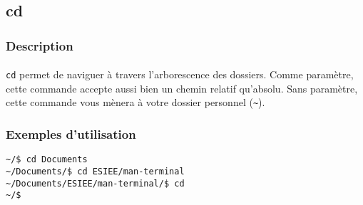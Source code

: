 \subsection{cd}
\subsubsection*{Description}

\paragraph{} \texttt{cd} permet de naviguer à travers l'arborescence des
dossiers. Comme paramètre, cette commande accepte aussi bien un chemin relatif
qu'absolu. Sans paramètre, cette commande vous mènera à votre dossier personnel
(\texttt{\~}).

\subsubsection*{Exemples d'utilisation}

\begin{lstlisting}
~/$ cd Documents
~/Documents/$ cd ESIEE/man-terminal
~/Documents/ESIEE/man-terminal/$ cd
~/$
\end{lstlisting}
